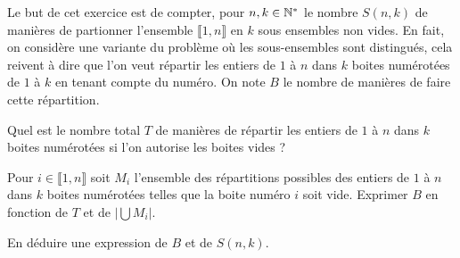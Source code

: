 \documentclass[french]{report}
\begin{document}
\begin{exo}
    Le but de cet exercice est de compter, pour \(n,k\in\mathbb{N}^*\) le nombre \(S(n,k)\)
    de manières de partionner l'ensemble \(\llbracket1,n\rrbracket\) en \(k\) sous
    ensembles non vides. En fait, on considère une variante du problème où les
    sous-ensembles sont distingués, cela reivent à dire que l'on veut répartir les entiers
    de \(1\) à \(n\) dans \(k\) boites numérotées de \(1\) à \(k\) en tenant compte
    du numéro. On note \(B\) le nombre de manières de faire cette répartition.
    \begin{q}{1}
        Quel est le nombre total \(T\) de manières de répartir les entiers de \(1\) à \(n\)
        dans \(k\) boites numérotées si l'on autorise les boites vides ?
    \end{q}
    \begin{q}{2}
        Pour \(i\in\llbracket1,n\rrbracket\) soit \(M_i\) l'ensemble des répartitions
        possibles des entiers de \(1\) à \(n\) dans \(k\) boites numérotées telles que
        la boite numéro \(i\) soit vide. Exprimer \(B\) en fonction de \(T\)
        et de \(|\bigcup M_i|\).
    \end{q}
    \begin{q}{3}
        En déduire une expression de \(B\) et de \(S(n,k)\).
    \end{q}
\end{exo}
\end{document}
